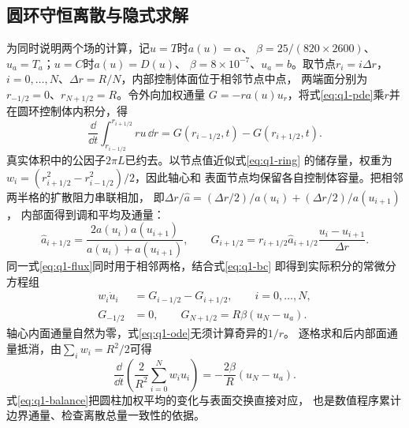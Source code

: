 \subsection{圆环守恒离散与隐式求解}
为同时说明两个场的计算，记$u=T$时$a(u)=\alpha$、
$\beta=25/(820\times2600)$、$u_a=T_a$；$u=C$时$a(u)=D(u)$、
$\beta=8\times10^{-7}$、$u_a=b$。取节点$r_i=i\Delta r$，
$i=0,\ldots,N$、$\Delta r=R/N$，内部控制体面位于相邻节点中点，
两端面分别为$r_{-1/2}=0$、$r_{N+1/2}=R$。令外向加权通量
$G=-ra(u)u_r$，将式\eqref{eq:q1-pde}乘$r$并在圆环控制体内积分，得
\begin{equation}
\frac{\dd}{\dd t}\int_{r_{i-1/2}}^{r_{i+1/2}}ru\,\dd r
=G(r_{i-1/2},t)-G(r_{i+1/2},t).
\label{eq:q1-ring}
\end{equation}
真实体积中的公因子$2\pi L$已约去。以节点值近似式\eqref{eq:q1-ring}
的储存量，权重为$w_i=(r_{i+1/2}^2-r_{i-1/2}^2)/2$，因此轴心和
表面节点均保留各自控制体容量。把相邻两半格的扩散阻力串联相加，
即$\Delta r/\widehat a=(\Delta r/2)/a(u_i)+(\Delta r/2)/a(u_{i+1})$，
内部面得到调和平均及通量：
\begin{equation}
\widehat a_{i+1/2}=\frac{2a(u_i)a(u_{i+1})}{a(u_i)+a(u_{i+1})},\qquad
G_{i+1/2}=r_{i+1/2}\widehat a_{i+1/2}\frac{u_i-u_{i+1}}{\Delta r}.
\label{eq:q1-flux}
\end{equation}
同一式\eqref{eq:q1-flux}同时用于相邻两格，结合式\eqref{eq:q1-bc}
即得到实际积分的常微分方程组
\begin{equation}
\begin{aligned}
w_i\dot u_i&=G_{i-1/2}-G_{i+1/2},\qquad i=0,\ldots,N,\\
G_{-1/2}&=0,\qquad G_{N+1/2}=R\beta(u_N-u_a).
\end{aligned}
\label{eq:q1-ode}
\end{equation}
轴心内面通量自然为零，式\eqref{eq:q1-ode}无须计算奇异的$1/r$。
逐格求和后内部面通量抵消，由$\sum_iw_i=R^2/2$可得
\begin{equation}
\frac{\dd}{\dd t}\left(\frac{2}{R^2}\sum_{i=0}^Nw_i u_i\right)
=-\frac{2\beta}{R}(u_N-u_a).
\label{eq:q1-balance}
\end{equation}
式\eqref{eq:q1-balance}把圆柱加权平均的变化与表面交换直接对应，
也是数值程序累计边界通量、检查离散总量一致性的依据。

